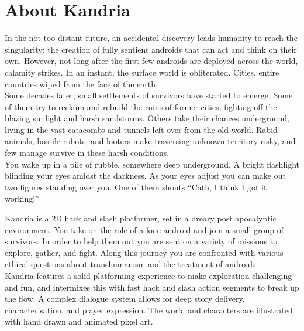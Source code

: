 \section{About Kandria}
In the not too distant future, an accidental discovery leads humanity to reach the singularity: the creation of fully sentient androids that can act and think on their own. However, not long after the first few androids are deployed across the world, calamity strikes. In an instant, the surface world is obliterated. Cities, entire countries wiped from the face of the earth. \\

Some decades later, small settlements of survivors have started to emerge. Some of them try to reclaim and rebuild the ruins of former cities, fighting off the blazing sunlight and harsh sandstorms. Others take their chances underground, living in the vast catacombs and tunnels left over from the old world. Rabid animals, hostile robots, and looters make traversing unknown territory risky, and few manage survive in these harsh conditions. \\

You wake up in a pile of rubble, somewhere deep underground. A bright flashlight blinding your eyes amidst the darkness. As your eyes adjust you can make out two figures standing over you. One of them shouts ``Cath, I think I got it working!'' \\

\vskip1cm

Kandria is a 2D hack and slash platformer, set in a dreary post apocalyptic environment. You take on the role of a lone android and join a small group of survivors. In order to help them out you are sent on a variety of missions to explore, gather, and fight. Along this journey you are confronted with various ethical questions about transhumanism and the treatment of androids. \\

Kandria features a solid platforming experience to make exploration challenging and fun, and intermixes this with fast hack and slash action segments to break up the flow. A complex dialogue system allows for deep story delivery, characterisation, and player expression. The world and characters are illustrated with hand drawn and animated pixel art. \\

